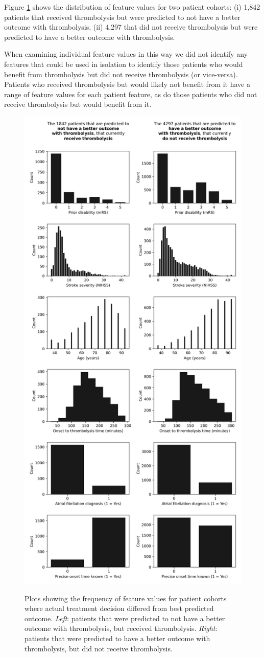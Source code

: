 Figure \ref{fig:decriptive_plots_2_cohorts} shows the distribution of feature values for two patient cohorts: (i) 1,842 patients that received thrombolysis but were predicted to not have a better outcome with thrombolysis, (ii) 4,297 that did not receive thrombolysis but were predicted to have a better outcome with thrombolysis.

When examining individual feature values in this way we did not identify any features that could be used in isolation to identify those patients who would benefit from thrombolysis but did not receive thrombolysis (or vice-versa). Patients who received thrombolysis but would likely not benefit from it have a range of feature values for each patient feature, as do those patients who did not receive thrombolysis but would benefit from it.

\begin{figure}
    \centering
    \captionsetup{width=1\linewidth}
    \includegraphics[width=0.6\linewidth]{./images/210_xgb_all_data_multiclass_outcome_descriptive_plots_2_patient_cohorts}\\
  \caption{Plots showing the frequency of feature values for patient cohorts where actual treatment decision differed from best predicted outcome. \textit{Left}: patients that were predicted to not have a better outcome with thrombolysis, but received thrombolysis. \textit{Right}: patients that were predicted to have a better outcome with thrombolysis, but did not receive thrombolysis.}
  \label{fig:decriptive_plots_2_cohorts}
\end{figure}

